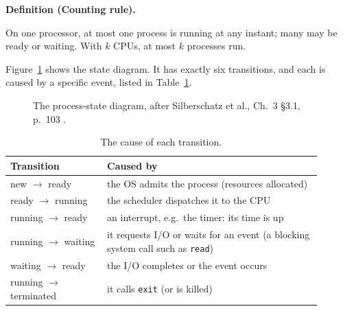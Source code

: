 \documentclass[11pt]{article}
\newenvironment{definitionbox}[1]{%
  \par\noindent\textbf{Definition (#1).}\ \itshape
}{\par\vspace{0.3em}}
\begin{document}
\begin{definitionbox}{Counting rule}
On one processor, at most one process is running at any instant; many may be
ready or waiting. With $k$ CPUs, at most $k$ processes run.
\end{definitionbox}

Figure~\ref{fig:states} shows the state diagram. It has exactly six
transitions, and each is caused by a specific event, listed in
Table~\ref{tab:trans}.

\begin{figure}[h]
\centering
{}
\caption{The process-state diagram, after Silberschatz et al., Ch.~3 \S3.1,
p.~103 \cite{SilberschatzOSC_operating_system_concepts}.}
\label{fig:states}
\end{figure}

\begin{table}[h]
\centering\small
\renewcommand{\arraystretch}{1.25}
\begin{tabular}{@{}>{\raggedright\arraybackslash}p{0.28\linewidth}>{\raggedright\arraybackslash}p{0.62\linewidth}@{}}
\toprule
\textbf{Transition} & \textbf{Caused by} \\
\midrule
new $\to$ ready & the OS admits the process (resources allocated) \\
ready $\to$ running & the scheduler dispatches it to the CPU \\
running $\to$ ready & an interrupt, e.g.\ the timer: its time is up \\
running $\to$ waiting & it requests I/O or waits for an event (a blocking system call such as \texttt{read}) \\
waiting $\to$ ready & the I/O completes or the event occurs \\
running $\to$ terminated & it calls \texttt{exit} (or is killed) \\
\bottomrule
\end{tabular}
\caption{The cause of each transition.}
\label{tab:trans}
\end{table}
\end{document}
